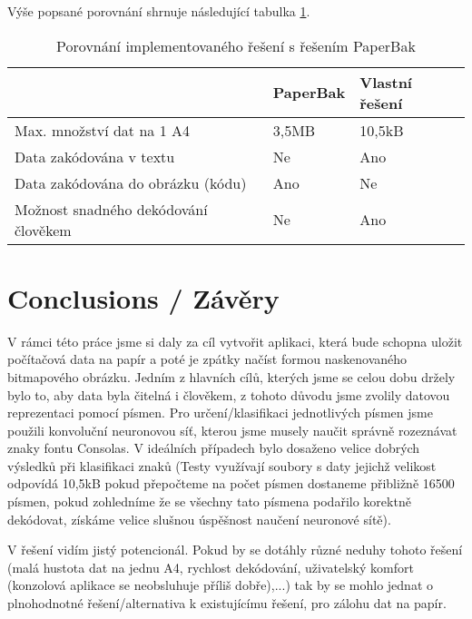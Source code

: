 \documentclass[conference]{IEEEtran}
\begin{document}
Výše popsané porovnání shrnuje následující tabulka \ref{tabulka:porovnani_reseni}.

\begin{table}[]
	\caption{Porovnání implementovaného řešení s řešením PaperBak}
	\label{tabulka:porovnani_reseni}
	\begin{tabular}{|l|l|l|}
		\hline
		& PaperBak & Vlastní řešení \\ \hline
		Max. množství dat na 1 A4            & 3,5MB    & 10,5kB  \\ \hline
		Data zakódována v textu              & Ne       & Ano     \\ \hline
		Data zakódována do obrázku (kódu)    & Ano      & Ne      \\ \hline
		Možnost snadného dekódování člověkem & Ne       & Ano     \\ \hline
	\end{tabular}
\end{table}

\section{Conclusions / Závěry}

V rámci této práce jsme si daly za cíl vytvořit aplikaci, která bude schopna uložit počítačová data na papír a poté je zpátky načíst formou naskenovaného bitmapového obrázku. Jedním z hlavních cílů, kterých jsme se celou dobu držely bylo to, aby data byla čitelná i člověkem, z tohoto důvodu jsme zvolily datovou reprezentaci pomocí písmen. Pro určení/klasifikaci jednotlivých písmen jsme použili konvoluční neuronovou síť, kterou jsme musely naučit správně rozeznávat znaky fontu Consolas. V ideálních případech bylo dosaženo velice dobrých výsledků při klasifikaci znaků (Testy využívají soubory s daty jejichž velikost odpovídá 10,5kB pokud přepočteme na počet písmen dostaneme přibližně 16500 písmen, pokud zohledníme že se všechny tato písmena podařilo korektně dekódovat, získáme velice slušnou úspěšnost naučení neuronové sítě). 

V řešení vidím jistý potencionál. Pokud by se dotáhly různé neduhy tohoto řešení (malá hustota dat na jednu A4, rychlost dekódování, uživatelský komfort (konzolová aplikace se neobsluhuje příliš dobře),...) tak by se mohlo jednat o plnohodnotné řešení/alternativa k existujícímu řešení, pro zálohu dat na papír.
\end{document}
